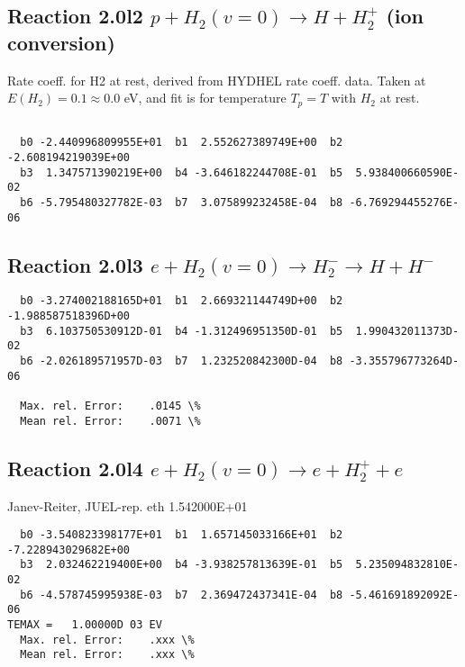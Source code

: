 \documentclass[12pt,dvipdfmx]{article}
\begin{document}
\subsection{
Reaction 2.0l2
$ p + H_2(v=0) \rightarrow H + H_2^+$ (ion conversion)
}
Rate coeff. for H2 at rest, derived from HYDHEL rate coeff. data.
Taken at $E(H_2) = 0.1 \approx 0.0$ eV,  and fit is for temperature $T_p=T$ with $H_2$ at rest.

\begin{small}\begin{verbatim}

  b0 -2.440996809955E+01  b1  2.552627389749E+00  b2 -2.608194219039E+00
  b3  1.347571390219E+00  b4 -3.646182244708E-01  b5  5.938400660590E-02
  b6 -5.795480327782E-03  b7  3.075899232458E-04  b8 -6.769294455276E-06

\end{verbatim}\end{small}

\newpage

\subsection{
Reaction 2.0l3
 $ e + H_2(v=0) \rightarrow H_2^- \rightarrow H + H^-$
}


\begin{small}\begin{verbatim}
  b0 -3.274002188165D+01  b1  2.669321144749D+00  b2 -1.988587518396D+00
  b3  6.103750530912D-01  b4 -1.312496951350D-01  b5  1.990432011373D-02
  b6 -2.026189571957D-03  b7  1.232520842300D-04  b8 -3.355796773264D-06

  Max. rel. Error:    .0145 \%
  Mean rel. Error:    .0071 \%
\end{verbatim}\end{small}


\subsection{
Reaction 2.0l4
 $ e + H_2(v=0) \rightarrow e + H_2^+ + e$
}
Janev-Reiter, JUEL-rep. eth 1.542000E+01

\begin{small}\begin{verbatim}
  b0 -3.540823398177E+01  b1  1.657145033166E+01  b2 -7.228943029682E+00
  b3  2.032462219400E+00  b4 -3.938257813639E-01  b5  5.235094832810E-02
  b6 -4.578745995938E-03  b7  2.369472437341E-04  b8 -5.461691892092E-06
TEMAX =   1.00000D 03 EV
  Max. rel. Error:    .xxx \%
  Mean rel. Error:    .xxx \%
\end{verbatim}\end{small}
\end{document}
